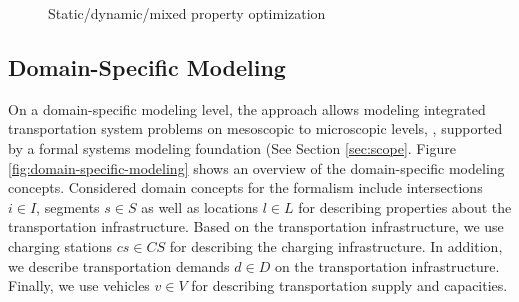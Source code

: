 \documentclass[10pt,twocolumn]{article}
\begin{document}
\begin{figure}[tbp]
	\centering
	\caption{Static/dynamic/mixed property optimization}
	\label{fig:concept}
\end{figure}





\subsection{Domain-Specific Modeling}
\label{sec:domain-specific-modeling}


On a domain-specific modeling level, the approach allows modeling integrated transportation system problems on mesoscopic to 
microscopic levels, \cite{ascher_hackenberg_2014, ascher_hackenberg_2015}, supported by a formal systems modeling foundation \cite{ascher_hackenberg_2016, ascher_hackenberg_2017} (See Section  \ref{sec:scope}. Figure \ref{fig:domain-specific-modeling} shows an overview of the domain-specific modeling concepts. Considered domain concepts for the formalism include intersections $i \in I$, segments $s \in S$ as well as locations $l \in L$ for describing properties about the transportation infrastructure. Based on the transportation infrastructure, we use charging stations $cs \in CS$ for describing the charging infrastructure. In addition, we describe transportation demands $d \in D$ on the transportation infrastructure. Finally, we use vehicles $v \in V$ for describing transportation supply and capacities.
\end{document}
